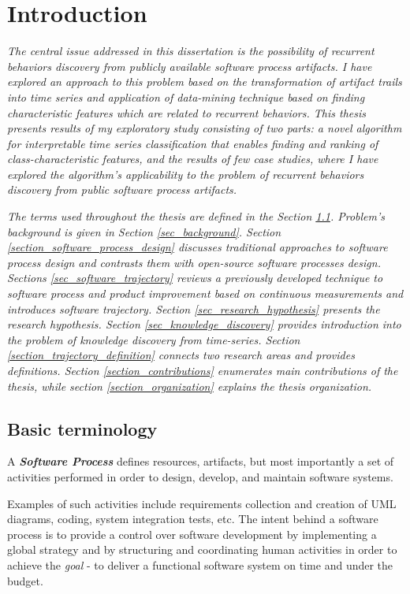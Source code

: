 \chapter{Introduction}\label{chapter_introduction}
\textit{The central issue addressed in this dissertation is the possibility of recurrent 
behaviors discovery from publicly available software process artifacts. 
I have explored an approach to this problem based on the transformation of artifact trails into 
time series and application of data-mining technique based on finding characteristic features which 
are related to recurrent behaviors. 
This thesis presents results of my exploratory study consisting of two parts: 
a novel algorithm for interpretable time series classification that enables finding 
and ranking of class-characteristic features, 
and the results of few case studies, where I have explored the algorithm's applicability to the 
problem of recurrent behaviors discovery from public software process artifacts.}

\textit{The terms used throughout the thesis are defined in the Section \ref{sec_terminology}. 
Problem's background is given in Section \ref{sec_background}. 
Section \ref{section_software_process_design} discusses traditional approaches to software process 
design and contrasts them with open-source software processes design.
Sections \ref{sec_software_trajectory} reviews a previously developed technique to software process 
and product improvement based on continuous measurements and introduces software trajectory.
Section \ref{sec_research_hypothesis} presents the research hypothesis.
Section \ref{sec_knowledge_discovery} provides introduction into the problem of knowledge discovery 
from time-series.
Section \ref{section_trajectory_definition} connects two research areas and provides definitions.
Section \ref{section_contributions} enumerates main contributions of the thesis, 
while section \ref{section_organization} explains the thesis organization.}

\section{Basic terminology}\label{sec_terminology}
\begin{defn}\label{def_process}
A \textbf{\textit{Software Process}} defines resources, artifacts, but most importantly a set
of activities performed in order to design, develop, and maintain software systems.
\end{defn}
Examples of such activities include requirements collection and creation of UML diagrams, 
coding, system integration tests, etc. The intent behind a software process is to provide a 
control over software development by implementing a global strategy and by structuring
and coordinating human activities in order to achieve the \textit{goal} - to deliver a functional
software system on time and under the budget. 

